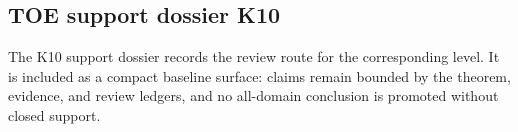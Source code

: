 \subsection{TOE support dossier K10}
The K10 support dossier records the review route for the corresponding level. It is included as a compact baseline surface: claims remain bounded by the theorem, evidence, and review ledgers, and no all-domain conclusion is promoted without closed support.
